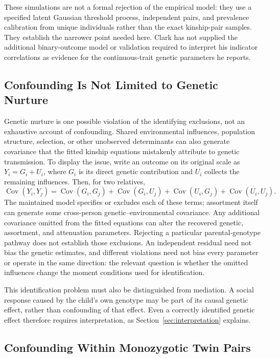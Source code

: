 \documentclass[12pt]{article}
\begin{document}
These simulations are not a formal rejection of the empirical model: they
use a specified latent Gaussian threshold process, independent pairs, and
prevalence calibration from unique individuals rather than the exact
kinship-pair samples. They establish the narrower point needed here. Clark
has not supplied the additional binary-outcome model or validation required
to interpret his indicator correlations as evidence for the continuous-trait
genetic parameters he reports.
\subsection{Confounding Is Not Limited to Genetic Nurture}
\label{sec:confounding-beyond-nurture}

Genetic nurture is one possible violation of the identifying exclusions,
not an exhaustive account of confounding. Shared environmental influences,
population structure, selection, or other unobserved determinants can
also generate covariance that the fitted kinship equations mistakenly
attribute to genetic transmission. To display the issue, write an outcome
on its original scale as $Y_i=G_i+U_i$, where $G_i$ is its direct genetic
contribution and $U_i$ collects the remaining influences. Then, for two
relatives,
\[
 \operatorname{Cov}(Y_i,Y_j)=\operatorname{Cov}(G_i,G_j)
 +\operatorname{Cov}(G_i,U_j)+\operatorname{Cov}(U_i,G_j)
 +\operatorname{Cov}(U_i,U_j).
\]
The maintained model specifies or excludes each of these terms; assortment
itself can generate some cross-person genetic--environmental covariance.
Any additional covariance omitted from the fitted equations can alter the
recovered genetic, assortment, and attenuation parameters. Rejecting a
particular parental-genotype pathway does not establish those exclusions.
An independent residual need not bias the genetic estimates, and different
violations need not bias every parameter or operate in the same direction:
the relevant question is whether the omitted influences change the moment
conditions used for identification.

This identification problem must also be distinguished from mediation.
A social response caused by the child's own genotype may be part of its
causal genetic effect, rather than confounding of that effect. Even a
correctly identified genetic effect therefore requires interpretation,
as Section~\ref{sec:interpretation} explains.

\subsection{Confounding Within Monozygotic Twin Pairs}
\end{document}
